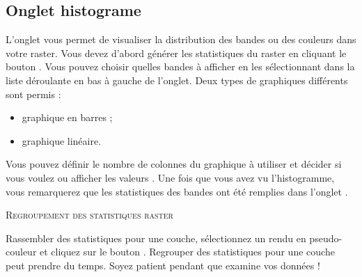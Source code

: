 \subsection{Onglet histograme}\label{label_histogram}

L'onglet   vous permet de visualiser la distribution
 des bandes ou des couleurs dans votre raster. Vous devez d'abord générer les statistiques du raster en cliquant le bouton . Vous pouvez choisir quelles bandes à afficher en les sélectionnant dans la liste déroulante en bas à gauche de l'onglet. Deux types de graphiques différents sont permis :

\begin{itemize}[label=--]
\item graphique en barres ;
\item graphique linéaire.
\end{itemize}

Vous pouvez définir le nombre de colonnes du graphique à utiliser et décider si vous voulez  ou afficher les valeurs . Une fois que vous avez vu l'histogramme, vous remarquerez que les statistiques des bandes ont été remplies dans l'onglet .

\begin{Tip}\caption{\textsc{Regroupement des statistiques raster}}
Rassembler des statistiques pour une couche, sélectionnez un rendu en pseudo-couleur et cliquez sur le bouton . Regrouper des statistiques pour une couche peut prendre du temps. Soyez patient pendant que \qg examine  vos données !
\end{Tip}
